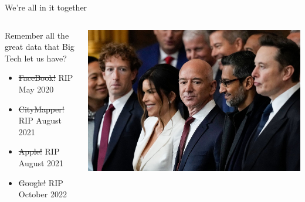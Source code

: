 \documentclass[
  ignorenonframetext,
  aspectratio=149,
]{beamer}
\providecommand{\tightlist}{%
  \setlength{\itemsep}{0pt}\setlength{\parskip}{0pt}}\usepackage{longtable,booktabs,array}
\begin{document}
\begin{frame}{We're all in it together}
\label{were-all-in-it-together-3}
\begin{columns}[T]
\begin{column}{0.6\textwidth}
Remember all the great data that Big Tech let us have?

\begin{itemize}
\tightlist
\item
  \st{FaceBook!} RIP May 2020
\item
  \st{CityMapper!} RIP August 2021
\item
  \st{Apple!} RIP August 2021
\item
  \st{Google!} RIP October 2022
\end{itemize}
\end{column}

\begin{column}{0.4\textwidth}
\includegraphics{images/tech_knobs.jpeg}
\end{column}
\end{columns}
\end{frame}
\end{document}
